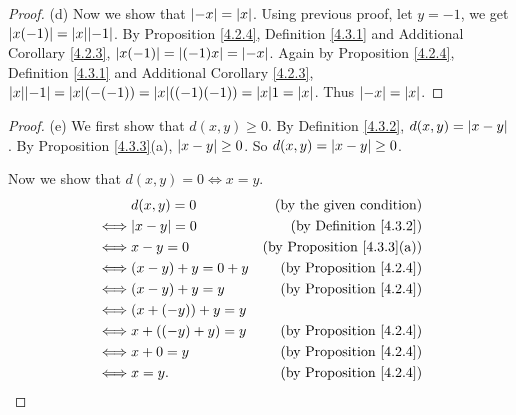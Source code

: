 \begin{proof}{(d)}
    Now we show that \(\abs*{-x} = \abs*{x}\).
    Using previous proof, let \(y = -1\), we get \(\abs*{x(-1)} = \abs*{x}\abs*{-1}\).
    By Proposition \ref{4.2.4}, Definition \ref{4.3.1} and Additional Corollary \ref{4.2.3}, \(\abs*{x(-1)} = \abs*{(-1)x} = \abs*{-x}\).
    Again by Proposition \ref{4.2.4}, Definition \ref{4.3.1} and Additional Corollary \ref{4.2.3}, \(\abs*{x}\abs*{-1} = \abs*{x}(-(-1)) = \abs*{x}((-1)(-1)) = \abs*{x}1 = \abs*{x}\).
    Thus \(\abs*{-x} = \abs*{x}\).
\end{proof}

\begin{proof}{(e)}
    We first show that \(d(x, y) \geq 0\).
    By Definition \ref{4.3.2}, \(d(x, y) = \abs*{x - y}\).
    By Proposition \ref{4.3.3}(a), \(\abs*{x - y} \geq 0\).
    So \(d(x, y) = \abs*{x - y} \geq 0\).

    Now we show that \(d(x, y) = 0 \iff x = y\).
    \begin{align*}
             & d(x, y) = 0         & \text{(by the given condition)}        \\
        \iff & \abs*{x - y} = 0    & \text{(by Definition \ref{4.3.2})}     \\
        \iff & x - y = 0           & \text{(by Proposition \ref{4.3.3}(a))} \\
        \iff & (x - y) + y = 0 + y & \text{(by Proposition \ref{4.2.4})}    \\
        \iff & (x - y) + y = y     & \text{(by Proposition \ref{4.2.4})}    \\
        \iff & (x + (-y)) + y = y                                           \\
        \iff & x + ((-y) + y) = y  & \text{(by Proposition \ref{4.2.4})}    \\
        \iff & x + 0 = y           & \text{(by Proposition \ref{4.2.4})}    \\
        \iff & x = y.              & \text{(by Proposition \ref{4.2.4})}
    \end{align*}
\end{proof}

